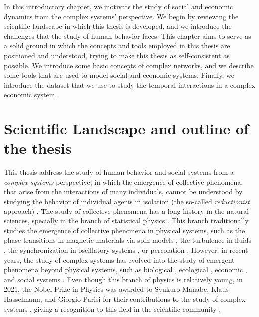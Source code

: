 \setcounter{page}{1}

In this introductory chapter, we motivate the study of social and economic dynamics from the complex systems' perspective. We begin by reviewing the scientific landscape in which this thesis is developed, and we introduce the challenges that the study of human behavior faces. This chapter aims to serve as a solid ground in which the concepts and tools employed in this thesis are positioned and understood, trying to make this thesis as self-consistent as possible. We introduce some basic concepts of complex networks, and we describe some tools that are used to model social and economic systems. Finally, we introduce the dataset that we use to study the temporal interactions in a complex economic system.

\section{\label{sec:scie_lands} Scientific Landscape and outline of the thesis}

This thesis address the study of human behavior and social systems from a \textit{complex systems} perspective, in which the emergence of collective phenomena, that arise from the interactions of many individuals, cannot be understood by studying the behavior of individual agents in isolation (the so-called \textit{reductionist} approach) \cite{anderson1972more}. The study of collective phenomena has a long history in the natural sciences, specially in the branch of statistical physics \cite{stanley1971phase}. This branch traditionally studies the emergence of collective phenomena in physical systems, such as the phase transitions in magnetic materials via spin models \cite{onsager-1944}, the turbulence in fluids \cite{frisch1995turbulence}, the synchronization in oscillatory systems \cite{pikovsky2001universal}, or percolation \cite{stauffer-1985}. However, in recent years, the study of complex systems has evolved into the study of emergent phenomena beyond physical systems, such as biological \cite{brown2000scaling,aderem-2005,alon2019introduction}, ecological \cite{may-2001}, economic \cite{limburg2002complex}, and social systems \cite{castellano2009statistical}. Even though this branch of physics is relatively young, in 2021, the Nobel Prize in Physics was awarded to Syukuro Manabe, Klaus Hasselmann, and Giorgio Parisi for their contributions to the study of complex systems \cite{nobel-2021}, giving a recognition to this field in the scientific community \cite{bianconi2023complex}.

